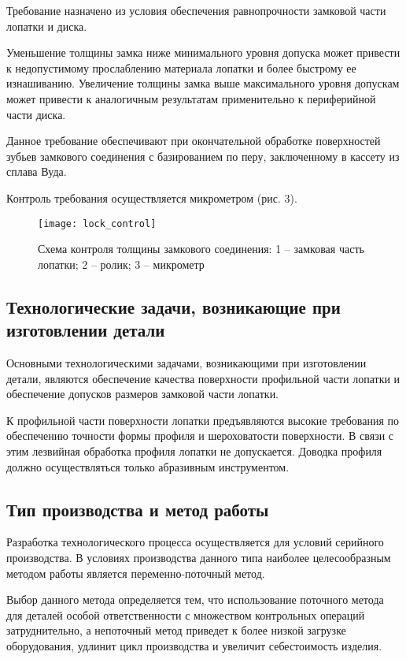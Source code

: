 Требование назначено из условия обеспечения равнопрочности замковой части лопатки и диска.

Уменьшение толщины замка ниже минимального уровня допуска может привести к недопустимому прослаблению материала лопатки и более быстрому ее изнашиванию. Увеличение толщины замка выше максимального уровня допускам может привести к аналогичным результатам применительно к периферийной части диска.

Данное требование обеспечивают при окончательной обработке поверхностей зубьев замкового соединения с базированием по перу, заключенному в кассету из сплава Вуда.

Контроль требования осуществляется микрометром (рис. 3).

\begin{figure}[H]
    \centering
    \texttt{[image: lock\_control]}
    \caption{Схема контроля толщины замкового соединения: 1 – замковая часть лопатки; 2 – ролик; 3 – микрометр}
\end{figure}

\subsection{Технологические задачи, возникающие при изготовлении детали}

Основными технологическими задачами, возникающими при изготовлении детали, являются обеспечение качества поверхности профильной части лопатки и обеспечение допусков размеров замковой части лопатки.

К профильной части поверхности лопатки предъявляются высокие требования по обеспечению точности формы профиля и шероховатости поверхности. В связи с этим лезвийная обработка профиля лопатки не допускается. Доводка профиля должно осуществляться только абразивным инструментом.

\subsection{Тип производства и метод работы}

Разработка технологического процесса осуществляется для условий серийного производства. В условиях производства данного типа наиболее целесообразным методом работы является переменно-поточный метод.

Выбор данного метода определяется тем, что использование поточного метода для деталей особой ответственности с множеством контрольных операций затруднительно, а непоточный метод приведет к более низкой загрузке оборудования, удлинит цикл производства и увеличит себестоимость изделия.

